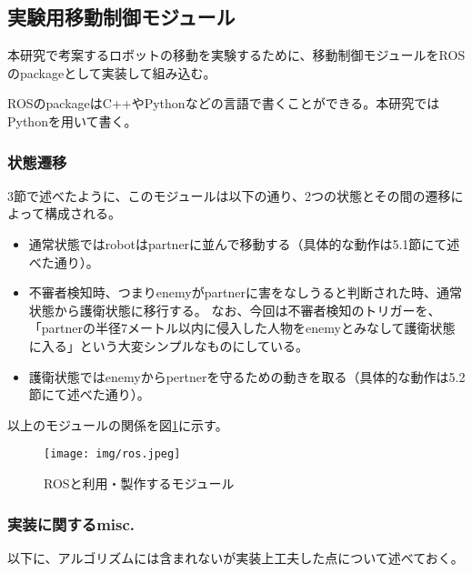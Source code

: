 \documentclass{kuisthesis}
\begin{document}
\subsection{実験用移動制御モジュール}

本研究で考案するロボットの移動を実験するために、移動制御モジュールをROSのpackageとして実装して組み込む。

ROSのpackageはC++やPythonなどの言語で書くことができる。本研究ではPythonを用いて書く。

\vspace{1.0em}

\subsubsection*{状態遷移}
3節で述べたように、このモジュールは以下の通り、2つの状態とその間の遷移によって構成される。
\begin{itemize}
	\item 通常状態ではrobotはpartnerに並んで移動する（具体的な動作は5.1節にて述べた通り）。
	\item 不審者検知時、つまりenemyがpartnerに害をなしうると判断された時、通常状態から護衛状態に移行する。
	なお、今回は不審者検知のトリガーを、「partnerの半径7メートル以内に侵入した人物をenemyとみなして護衛状態に入る」という大変シンプルなものにしている。
	\item 護衛状態ではenemyからpertnerを守るための動きを取る（具体的な動作は5.2節にて述べた通り）。
\end{itemize}

\vspace{1.0em}

以上のモジュールの関係を図\ref{fig:ros}に示す。

\begin{figure}[h]\begin{center}
	\texttt{[image: img/ros.jpeg]}
	\caption{ROSと利用・製作するモジュール}
	\label{fig:ros}
\end{center}\end{figure}

\newpage

\subsubsection*{実装に関するmisc.}

以下に、アルゴリズムには含まれないが実装上工夫した点について述べておく。
\end{document}
